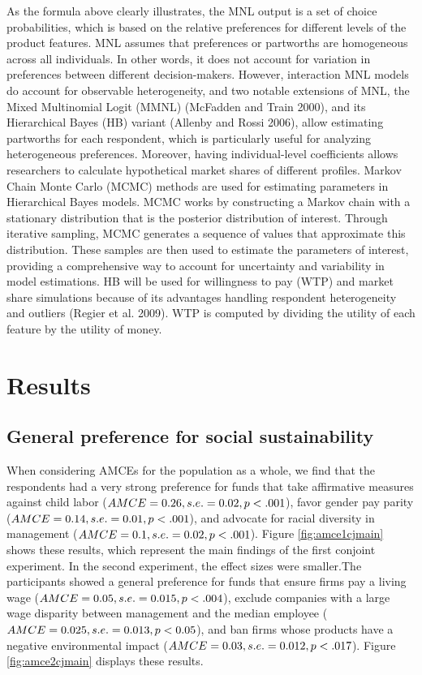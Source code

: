 \documentclass[
  12pt,
]{article}
\begin{document}
As the formula above clearly illustrates, the MNL output is a set of choice probabilities, which is based on the relative preferences for different levels of the product features. MNL assumes that preferences or partworths are homogeneous across all individuals. In other words, it does not account for variation in preferences between different decision-makers. However, interaction MNL models do account for observable heterogeneity, and two notable extensions of MNL, the Mixed Multinomial Logit (MMNL) (McFadden and Train 2000), and its Hierarchical Bayes (HB) variant (Allenby and Rossi 2006), allow estimating partworths for each respondent, which is particularly useful for analyzing heterogeneous preferences. Moreover, having individual-level coefficients allows researchers to calculate hypothetical market shares of different profiles. Markov Chain Monte Carlo (MCMC) methods are used for estimating parameters in Hierarchical Bayes models. MCMC works by constructing a Markov chain with a stationary distribution that is the posterior distribution of interest. Through iterative sampling, MCMC generates a sequence of values that approximate this distribution. These samples are then used to estimate the parameters of interest, providing a comprehensive way to account for uncertainty and variability in model estimations. HB will be used for willingness to pay (WTP) and market share simulations because of its advantages handling respondent heterogeneity and outliers (Regier et al. 2009). WTP is computed by dividing the utility of each feature by the utility of money.

\hypertarget{results}{%
\section{Results}\label{results}}

\hypertarget{general-preference-for-social-sustainability}{%
\subsection{General preference for social sustainability}\label{general-preference-for-social-sustainability}}

When considering AMCEs for the population as a whole, we find that the respondents had a very strong preference for funds that take affirmative measures against child labor (\(AMCE = 0.26, \space s.e. = 0.02, \space p < .001\)), favor gender pay parity (\(AMCE = 0.14, \space s.e. = 0.01, \space p < .001\)), and advocate for racial diversity in management (\(AMCE = 0.1, \space s.e. =0.02, \space p < .001\)). Figure \ref{fig:amce1cjmain} shows these results, which represent the main findings of the first conjoint experiment. In the second experiment, the effect sizes were smaller.The participants showed a general preference for funds that ensure firms pay a living wage (\(AMCE = 0.05, \space s.e. = 0.015, \space p < .004\)), exclude companies with a large wage disparity between management and the median employee (\(AMCE = 0.025, \space s.e. = 0.013, \space p <0.05\)), and ban firms whose products have a negative environmental impact (\(AMCE = 0.03, \space s.e. = 0.012, \space p < .017\)). Figure \ref{fig:amce2cjmain} displays these results.
\end{document}
